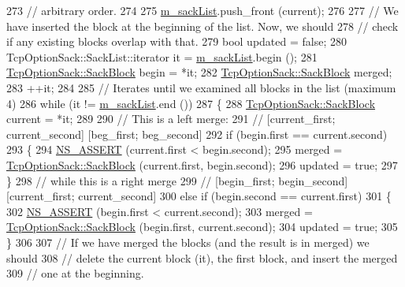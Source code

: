 \begin{DoxyCode}
273   \textcolor{comment}{//     arbitrary order.}
274 
275   \hyperlink{classns3_1_1TcpRxBuffer_aee4aac20f3e96f9108918d3650e58eb9}{m\_sackList}.push\_front (current);
276 
277   \textcolor{comment}{// We have inserted the block at the beginning of the list. Now, we should}
278   \textcolor{comment}{// check if any existing blocks overlap with that.}
279   \textcolor{keywordtype}{bool} updated = \textcolor{keyword}{false};
280   TcpOptionSack::SackList::iterator it = \hyperlink{classns3_1_1TcpRxBuffer_aee4aac20f3e96f9108918d3650e58eb9}{m\_sackList}.begin ();
281   \hyperlink{classns3_1_1TcpOptionSack_a9e1d07d8729fd3ac5ead7305794675c3}{TcpOptionSack::SackBlock} begin = *it;
282   \hyperlink{classns3_1_1TcpOptionSack_a9e1d07d8729fd3ac5ead7305794675c3}{TcpOptionSack::SackBlock} merged;
283   ++it;
284 
285   \textcolor{comment}{// Iterates until we examined all blocks in the list (maximum 4)}
286   \textcolor{keywordflow}{while} (it != \hyperlink{classns3_1_1TcpRxBuffer_aee4aac20f3e96f9108918d3650e58eb9}{m\_sackList}.end ())
287     \{
288       \hyperlink{classns3_1_1TcpOptionSack_a9e1d07d8729fd3ac5ead7305794675c3}{TcpOptionSack::SackBlock} current = *it;
289 
290       \textcolor{comment}{// This is a left merge:}
291       \textcolor{comment}{// [current\_first; current\_second] [beg\_first; beg\_second]}
292       \textcolor{keywordflow}{if} (begin.first == current.second)
293         \{
294           \hyperlink{assert_8h_a6dccdb0de9b252f60088ce281c49d052}{NS\_ASSERT} (current.first < begin.second);
295           merged = \hyperlink{classns3_1_1TcpOptionSack_a9e1d07d8729fd3ac5ead7305794675c3}{TcpOptionSack::SackBlock} (current.first, begin.second);
296           updated = \textcolor{keyword}{true};
297         \}
298       \textcolor{comment}{// while this is a right merge}
299       \textcolor{comment}{// [begin\_first; begin\_second] [current\_first; current\_second]}
300       \textcolor{keywordflow}{else} \textcolor{keywordflow}{if} (begin.second == current.first)
301         \{
302           \hyperlink{assert_8h_a6dccdb0de9b252f60088ce281c49d052}{NS\_ASSERT} (begin.first < current.second);
303           merged = \hyperlink{classns3_1_1TcpOptionSack_a9e1d07d8729fd3ac5ead7305794675c3}{TcpOptionSack::SackBlock} (begin.first, current.second);
304           updated = \textcolor{keyword}{true};
305         \}
306 
307       \textcolor{comment}{// If we have merged the blocks (and the result is in merged) we should}
308       \textcolor{comment}{// delete the current block (it), the first block, and insert the merged}
309       \textcolor{comment}{// one at the beginning.}

\end{DoxyCode}
